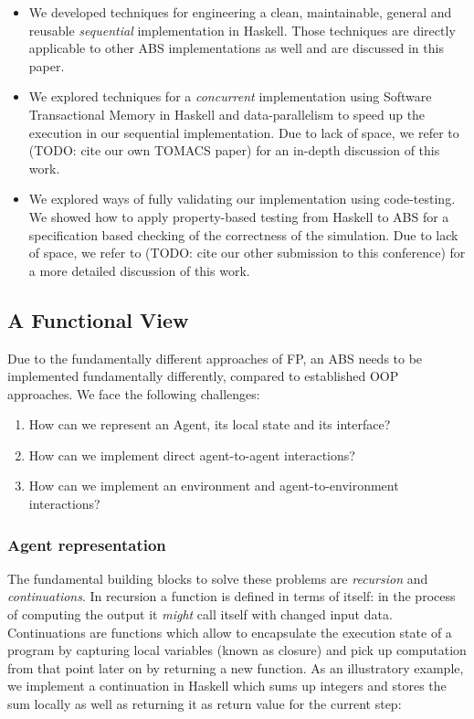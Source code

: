 \begin{itemize}
	\item We developed techniques for engineering a clean, maintainable, general and reusable \textit{sequential} implementation in Haskell. Those techniques are directly applicable to other ABS implementations as well and are discussed in this paper.
	
	\item We explored techniques for a \textit{concurrent} implementation using Software Transactional Memory in Haskell \cite{harris_composable_2005} and data-parallelism to speed up the execution in our sequential implementation. Due to lack of space, we refer to (TODO: cite our own TOMACS paper) for an in-depth discussion of this work.

	\item We explored ways of fully validating our implementation using code-testing. We showed how to apply property-based testing from Haskell \cite{claessen_quickcheck_2000} to ABS for a specification based checking of the correctness of the simulation. Due to lack of space, we refer to (TODO: cite our other submission to this conference) for a more detailed discussion of this work.
\end{itemize}

\subsection{A Functional View}
Due to the fundamentally different approaches of FP, an ABS needs to be implemented fundamentally differently, compared to established OOP approaches. We face the following challenges:

\begin{enumerate}
	\item How can we represent an Agent, its local state and its interface?
	\item How can we implement direct agent-to-agent interactions?
	\item How can we implement an environment and agent-to-environment interactions? 
\end{enumerate}

\subsubsection{Agent representation}
The fundamental building blocks to solve these problems are \textit{recursion} and \textit{continuations}. In recursion a function is defined in terms of itself: in the process of computing the output it \textit{might} call itself with changed input data. Continuations are functions which allow to encapsulate the execution state of a program by capturing local variables (known as closure) and pick up computation from that point later on by returning a new function. As an illustratory example, we implement a continuation in Haskell which sums up integers and stores the sum locally as well as returning it as return value for the current step:

